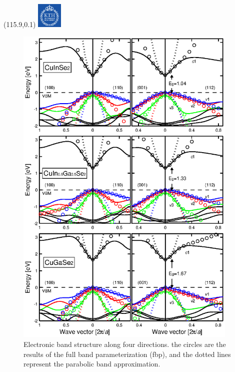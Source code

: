 \documentclass[]{beamer}
\newcommand{\MyLogo}{%
\begin{textblock}{14}(115.9,0.1)
  \includegraphics[width=1.22cm]{kth_rgb}
 \end{textblock}
}
\begin{document}
\begin{frame}
\MyLogo
\begin{figure}\label{bandstr}
  \begin{minipage}{0.5\textwidth} 
    \includegraphics[width=0.95\textwidth]{seminar/bandstructure}
  \end{minipage}%
  \begin{minipage}{0.5\textwidth}
    \caption{  Electronic band structure along four directions. the circles are the results of the full band parameterization (fbp), and the dotted lines represent the parabolic band approximation. }
  \end{minipage}
\end{figure}
\end{frame}
\end{document}
